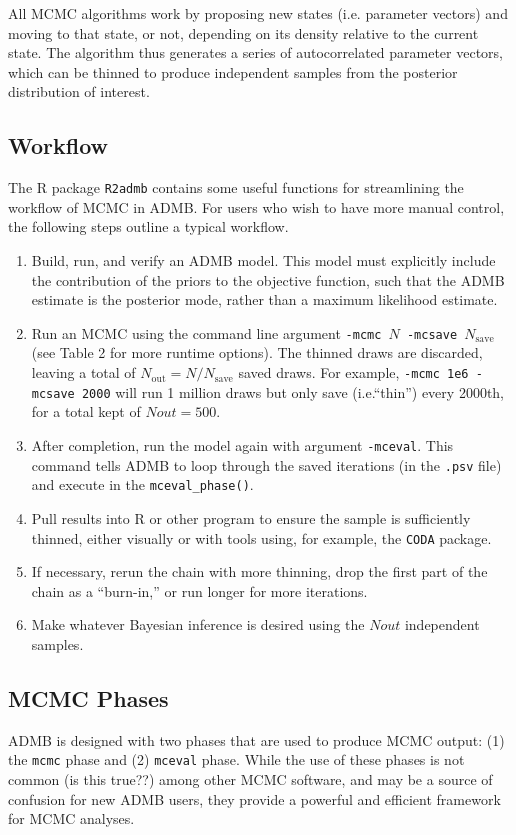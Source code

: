 \documentclass{article}\usepackage[]{graphicx}\usepackage[]{color}
\begin{document}
All MCMC algorithms work by proposing new states
(i.e. parameter vectors) and moving to that state, or not,
depending on its density relative to the current state. The
algorithm thus generates a series of autocorrelated parameter
vectors, which can be thinned to produce independent samples
from the posterior distribution of interest.

\subsection{Workflow}
The R package \texttt{R2admb} contains some useful functions
for streamlining the workflow of MCMC in ADMB. For users who
wish to have more manual control, the following steps
outline a typical workflow.
\begin{enumerate}
\item Build, run, and verify an ADMB model. This model must
  explicitly include the contribution of the priors to the
  objective function, such that the ADMB estimate is the
  posterior mode, rather than a maximum likelihood estimate.
\item Run an MCMC using the command line argument
  \texttt{-mcmc $N$ -mcsave $N_{\text{save}}$} (see Table 2 
  for more runtime options). The thinned draws are discarded,
  leaving a total of $N_{\text{out}}=N/N_{\text{save}}$
  saved draws. For example, \texttt{-mcmc 1e6 -mcsave 2000}
  will run 1 million draws but only save (i.e.``thin'')
  every 2000th, for a total kept of $Nout=500$.
\item After completion, run the model again with argument
  \texttt{-mceval}. This command tells ADMB to loop through
  the saved iterations (in the \texttt{.psv} file) and
  execute in the \texttt{mceval\_phase()}.
\item Pull results into R or other program to ensure the
  sample is sufficiently thinned, either visually or with
  tools using, for example, the \texttt{CODA} package.
\item If necessary, rerun the chain with more thinning, drop
  the first part of the chain as a ``burn-in,'' or run
  longer for more iterations.
\item Make whatever Bayesian inference is desired using the
  $Nout$ independent samples.
\end{enumerate}

\subsection{MCMC Phases}
ADMB is designed with two phases that are used to produce
MCMC output: (1) the \texttt{mcmc} phase and (2)
\texttt{mceval} phase. While the use of these phases is not
common (is this true??) among other MCMC software, and may
be a source of confusion for new ADMB users, they provide a
powerful and efficient framework for MCMC analyses.
\end{document}
